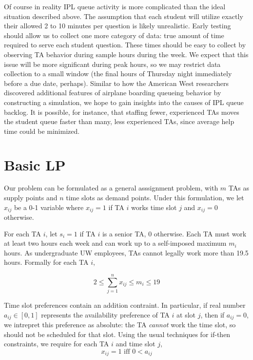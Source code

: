 \documentclass{article}
\begin{document}
\begin{multicols}{2}
Of course in reality IPL queue activity is more complicated than the ideal situation described above. The assumption that each student will utilize exactly their allowed 2 to 10 minutes per question is likely unrealistic. Early testing should allow us to collect one more category of data: true amount of time required to serve each student question. These times should be easy to collect by observing TA behavior during sample hours during the week. We expect that this issue will be more significant during peak hours, so we may restrict data collection to a small window (the final hours of Thursday night immediately before a due date, perhaps). Similar to how the American West researchers discovered additional features of airplane boarding queueing behavior by constructing a simulation, we hope to gain insights into the causes of IPL queue backlog. It is possible, for instance, that staffing fewer, experienced TAs moves the student queue faster than many, less experienced TAs, since average help time could be minimized.

\section*{Basic LP}
Our problem can be formulated as a general asssignment problem, with $m$ TAs as supply points and $n$ time slots as demand points. Under this formulation, we let $x_{ij}$ be a 0-1 variable where $x_{ij} = 1$ if TA $i$ works time slot $j$ and $x_{ij} = 0$ otherwise.

For each TA $i$, let $s_i = 1$ if TA $i$ is a senior TA, 0 otherwise. Each TA must work at least two hours each week and can work up to a self-imposed maximum $m_i$ hours. As undergraduate UW employees, TAs cannot legally work more than 19.5 hours. Formally for each TA $i$,

\begin{equation}
2 \leq \sum_{j=1}^{n}x_{ij} \leq m_i \leq 19
\end{equation}

Time slot preferences contain an addition contraint. In particular, if real number $a_{ij} \in [0,1]$ represents the availability preference of TA $i$ at slot $j$, then if $a_{ij} = 0$, we intrepret this preference as absolute: the TA \textit{cannot} work the time slot, so should not be scheduled for that slot. Using the usual techniques for if-then constraints, we require for each TA $i$ and time slot $j$,
\begin{equation}
x_{ij} = 1 \textrm{ iff } 0 < a_{ij}
\end{equation}


\end{multicols}
\end{document}
